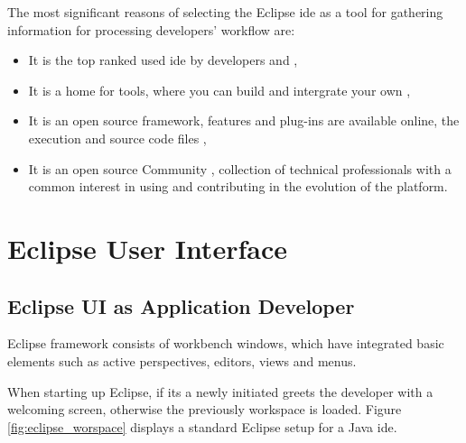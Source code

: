 The most significant reasons of selecting the Eclipse \gls{ide} as a tool for gathering information for processing developers' workflow are: 
\begin{itemize}

\item It is the top ranked used \gls{ide} by developers  and ,
\item It is a home for tools, where you can build and intergrate your own ,
\item It is an open source framework, features and plug-ins are available online, the execution and source code files ,
\item It is an open source Community , collection of technical professionals with a common interest in using and contributing in the evolution of the platform.
\end{itemize}  

\section{Eclipse User Interface}
\label{sec:TheEclipseIDE:ui}
\subsection{Eclipse UI as Application Developer}
Eclipse framework consists of workbench windows, which have integrated basic elements such as active perspectives, editors, views and menus.

When starting up Eclipse, if its a newly initiated greets the developer with a welcoming screen, otherwise the previously workspace is loaded. Figure \ref{fig:eclipse_worspace} displays a standard Eclipse setup for a Java \gls{ide}. 

